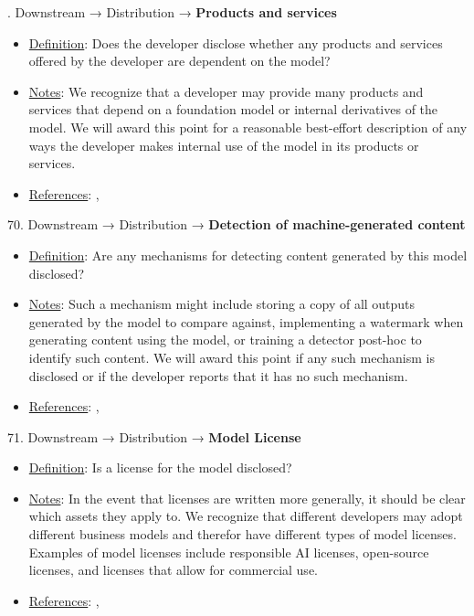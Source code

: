 . Downstream → Distribution → \textbf{Products and services}
\vspace{-\parskip}
\begin{itemize}
	\item
	\underline{Definition}: Does the developer disclose whether any products and services offered by the developer are dependent on the model?
	\item
	\underline{Notes}: We recognize that a developer may provide many products and services that depend on a foundation model or internal derivatives of the model. We will award this point for a reasonable best-effort description of any ways the developer makes internal use of the model in its products or services.
	\item
	\underline{References}: \citet{cobbe2023supply}, \citet{cen2023supplychain}
\end{itemize}


70. Downstream → Distribution → \textbf{Detection of machine-generated content}
\vspace{-\parskip}
\begin{itemize}
	\item
	\underline{Definition}: Are any mechanisms for detecting content generated by this model disclosed?
	\item
	\underline{Notes}: Such a mechanism might include storing a copy of all outputs generated by the model to compare against, implementing a watermark when generating content using the model, or training a detector post-hoc to identify such content. We will award this point if any such mechanism is disclosed or if the developer reports that it has no such mechanism.
	\item
	\underline{References}: \citet{kirchenbauer2023watermark}, \citet{Kuditipudi2023RobustDW}
\end{itemize}


71. Downstream → Distribution → \textbf{Model License}
\vspace{-\parskip}
\begin{itemize}
	\item
	\underline{Definition}: Is a license for the model disclosed?
	\item
	\underline{Notes}: In the event that licenses are written more generally, it should be clear which assets they apply to. We recognize that different developers may adopt different business models and therefor have different types of model licenses. Examples of model licenses include responsible AI licenses, open-source licenses, and licenses that allow for commercial use.
	\item
	\underline{References}: \citet{Pistilli2023}, \citet{chen2023investigation}
\end{itemize}


